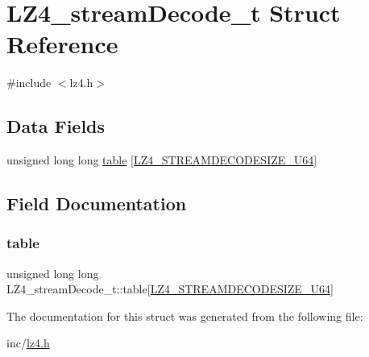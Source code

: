 \hypertarget{struct_l_z4__stream_decode__t}{}\section{L\+Z4\+\_\+stream\+Decode\+\_\+t Struct Reference}
\label{struct_l_z4__stream_decode__t}


{\ttfamily \#include $<$lz4.\+h$>$}

\subsection*{Data Fields}
\begin{DoxyCompactItemize}
\item 
unsigned long long \mbox{\hyperlink{struct_l_z4__stream_decode__t_a66753ac76e6b36336f3d4f3fb4714885}{table}} \mbox{[}\mbox{\hyperlink{lz4_8h_a414ecb38e0607f239de5ebca5a5beef5}{L\+Z4\+\_\+\+S\+T\+R\+E\+A\+M\+D\+E\+C\+O\+D\+E\+S\+I\+Z\+E\+\_\+\+U64}}\mbox{]}
\end{DoxyCompactItemize}


\subsection{Field Documentation}
\mbox{\label{struct_l_z4__stream_decode__t_a66753ac76e6b36336f3d4f3fb4714885}} 
\subsubsection{\texorpdfstring{table}{table}}
{\footnotesize\ttfamily unsigned long long L\+Z4\+\_\+stream\+Decode\+\_\+t\+::table\mbox{[}\mbox{\hyperlink{lz4_8h_a414ecb38e0607f239de5ebca5a5beef5}{L\+Z4\+\_\+\+S\+T\+R\+E\+A\+M\+D\+E\+C\+O\+D\+E\+S\+I\+Z\+E\+\_\+\+U64}}\mbox{]}}



The documentation for this struct was generated from the following file\+:\begin{DoxyCompactItemize}
\item 
inc/\mbox{\hyperlink{lz4_8h}{lz4.\+h}}\end{DoxyCompactItemize}
